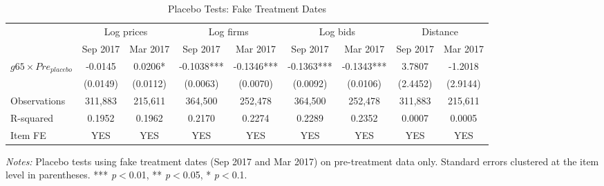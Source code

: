 \begin{table}[htbp]
\centering
\caption{Placebo Tests: Fake Treatment Dates}
\label{tab:placebo}
\begin{adjustbox}{max width=\textwidth}
\begin{threeparttable}
\small
\begin{tabular}{lcccccccc}
\toprule
 & \multicolumn{2}{c}{Log prices} & \multicolumn{2}{c}{Log firms} & \multicolumn{2}{c}{Log bids} & \multicolumn{2}{c}{Distance} \\
\cmidrule(lr){2-3} \cmidrule(lr){4-5} \cmidrule(lr){6-7} \cmidrule(lr){8-9}
 & Sep 2017 & Mar 2017 & Sep 2017 & Mar 2017 & Sep 2017 & Mar 2017 & Sep 2017 & Mar 2017 \\
\midrule
$g65 \times Pre_{placebo}$ & -0.0145 & 0.0206* & -0.1038*** & -0.1346*** & -0.1363*** & -0.1343*** & 3.7807 & -1.2018 \\
 & (0.0149) & (0.0112) & (0.0063) & (0.0070) & (0.0092) & (0.0106) & (2.4452) & (2.9144) \\
\midrule
Observations & 311,883 & 215,611 & 364,500 & 252,478 & 364,500 & 252,478 & 311,883 & 215,611 \\
R-squared & 0.1952 & 0.1962 & 0.2170 & 0.2274 & 0.2289 & 0.2352 & 0.0007 & 0.0005 \\
Item FE & YES & YES & YES & YES & YES & YES & YES & YES \\
\bottomrule
\end{tabular}
\begin{tablenotes}
\small
\item \textit{Notes:} Placebo tests using fake treatment dates (Sep 2017 and Mar 2017) on pre-treatment data only.
Standard errors clustered at the item level in parentheses.
*** \textit{p}$<$0.01, ** \textit{p}$<$0.05, * \textit{p}$<$0.1.
\end{tablenotes}
\end{threeparttable}
\end{adjustbox}
\end{table}
